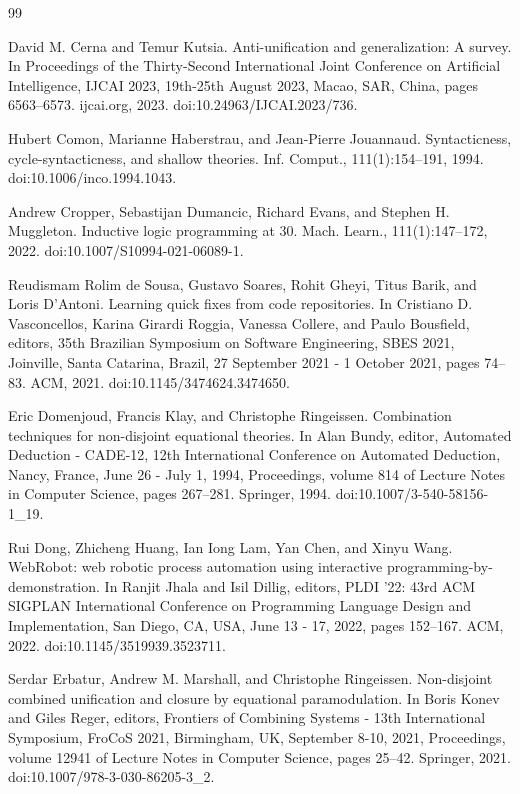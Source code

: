 \documentclass[10pt,a4paper]{amsart}
\begin{document}
\begin{thebibliography}{99}
\par\noindent  [16]  David M. Cerna and Temur Kutsia.  Anti-unification and generalization: A survey.  In Proceedings of the Thirty-Second International Joint Conference on Artificial Intelligence, IJCAI 2023, 19th-25th August 2023, Macao, SAR, China, pages 6563–6573. ijcai.org, 2023.  doi:10.24963/IJCAI.2023/736.  
 
\par\noindent  [17]  Hubert Comon, Marianne Haberstrau, and Jean-Pierre Jouannaud.  Syntacticness, cycle-syntacticness, and shallow theories.  Inf. Comput., 111(1):154–191, 1994.  doi:10.1006/inco.1994.1043.  
 
\par\noindent  [18]  Andrew Cropper, Sebastijan Dumancic, Richard Evans, and Stephen H. Muggleton.  Inductive logic programming at 30.  Mach. Learn., 111(1):147–172, 2022.  doi:10.1007/S10994-021-06089-1.  
 
\par\noindent  [19]  Reudismam Rolim de Sousa, Gustavo Soares, Rohit Gheyi, Titus Barik, and Loris D’Antoni.  Learning quick fixes from code repositories.  In Cristiano D. Vasconcellos, Karina Girardi Roggia, Vanessa Collere, and Paulo Bousfield, editors, 35th Brazilian Symposium on Software Engineering, SBES 2021, Joinville, Santa Catarina, Brazil, 27 September 2021 - 1 October 2021, pages 74–83. ACM, 2021.  doi:10.1145/3474624.3474650.  
 
\par\noindent  [20]  Eric Domenjoud, Francis Klay, and Christophe Ringeissen.  Combination techniques for non-disjoint equational theories.  In Alan Bundy, editor, Automated Deduction - CADE-12, 12th International Conference on Automated Deduction, Nancy, France, June 26 - July 1, 1994, Proceedings, volume 814 of Lecture Notes in Computer Science, pages 267–281. Springer, 1994.  doi:10.1007/3-540-58156-1\_19.  
 
\par\noindent  [21]  Rui Dong, Zhicheng Huang, Ian Iong Lam, Yan Chen, and Xinyu Wang.  WebRobot: web robotic process automation using interactive programming-by-demonstration.  In Ranjit Jhala and Isil Dillig, editors, PLDI ’22: 43rd ACM SIGPLAN International Conference on Programming Language Design and Implementation, San Diego, CA, USA, June 13 - 17, 2022, pages 152–167. ACM, 2022.  doi:10.1145/3519939.3523711.  
 
\par\noindent  [22]  Serdar Erbatur, Andrew M. Marshall, and Christophe Ringeissen.  Non-disjoint combined unification and closure by equational paramodulation.  In Boris Konev and Giles Reger, editors, Frontiers of Combining Systems - 13th International Symposium, FroCoS 2021, Birmingham, UK, September 8-10, 2021, Proceedings, volume 12941 of Lecture Notes in Computer Science, pages 25–42. Springer, 2021.  doi:10.1007/978-3-030-86205-3\_2.  
 

\end{thebibliography}
\end{document}
